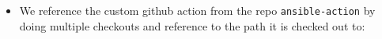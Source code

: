 \begin{itemize}
    \begin{itemize}
        \item We reference the custom github action from the repo \texttt{ansible-action} by doing multiple checkouts and reference to the path it is checked out to:





\end{itemize}
\end{itemize}
